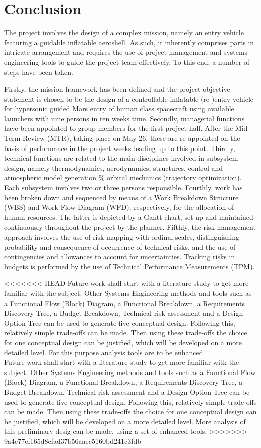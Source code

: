 \section{Conclusion}\label{cha:conclusion}
The project involves the design of a complex mission, namely an entry vehicle featuring a guidable inflatable aeroshell. As such, it inherently comprises parts in intricate arrangement and requires the use of project management and systems engineering tools to guide the project team effectively. To this end, a number of steps have been taken. 

Firstly, the mission framework has been defined and the project objective statement is chosen to be the design of a controllable inflatable (re-)entry vehicle for hypersonic guided Mars entry of human class spacecraft using available launchers with nine persons in ten weeks time.  Secondly, managerial functions have been appointed to group members for the first project half. After the Mid-Term Review (MTR), taking place on May 26, these are re-appointed on the basis of performance in the project weeks leading up to this point. Thirdly, technical functions are related to the main disciplines involved in subsystem design, namely thermodynamics, aerodynamics, structures, control and atmospheric model generation $\%$ orbital mechanics (trajectory optimization). Each subsystem involves two or three persons responsible. Fourthly, work has been broken down  and sequenced by means of a Work Breakdown Structure (WBS) and Work Flow Diagram (WFD), respectively, for the allocation of human resources. The latter is depicted by a Gantt chart, set up and maintained continuously throughout the project by the planner. Fifthly, the risk management approach involves the use of risk mapping with ordinal scales, distinguishing probability and consequence of occurrence of technical risks, and the use of contingencies and allowances to account for uncertainties. Tracking risks in budgets is performed by the use of Technical Performance Measurements (TPM).

<<<<<<< HEAD
Future work shall start with a literature study to get more familiar with the subject. Other Systems Engineering methods and tools such as a Functional Flow (Block) Diagram, a Functional Breakdown, a Requirements Discovery Tree, a Budget Breakdown, Technical risk assessment and a Design Option Tree can be used to generate five conceptual design. Following this, relatively simple trade-offs can be made. Then using these trade-offs the choice for one conceptual design can be justified, which will be developed on a more detailed level. For this purpose analysis tools are to be enhanced.
=======
Future work shall start with a literature study to get more familiar with the subject. Other Systems Engineering methods and tools such as a Functional Flow (Block) Diagram, a Functional Breakdown, a Requirements Discovery Tree, a Budget Breakdown, Technical risk assessment and a Design Option Tree can be used to generate five conceptual design. Following this, relatively simple trade-offs can be made. Then using these trade-offs the choice for one conceptual design can be justified, which will be developed on a more detailed level. More analysis of this preliminary desig can be made, using a set of enhanced tools. 
>>>>>>> 9a4e77cf165d8cfad37b56aaec5160bd241c3fdb

